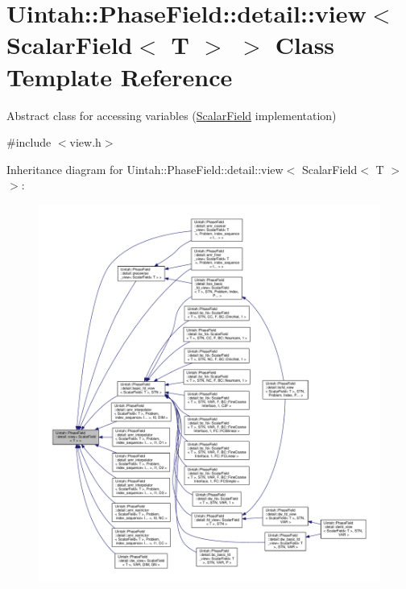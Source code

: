 \hypertarget{classUintah_1_1PhaseField_1_1detail_1_1view_3_01ScalarField_3_01T_01_4_01_4}{}\section{Uintah\+:\+:Phase\+Field\+:\+:detail\+:\+:view$<$ Scalar\+Field$<$ T $>$ $>$ Class Template Reference}
\label{classUintah_1_1PhaseField_1_1detail_1_1view_3_01ScalarField_3_01T_01_4_01_4}


Abstract class for accessing variables (\hyperlink{structUintah_1_1PhaseField_1_1ScalarField}{Scalar\+Field} implementation)  




{\ttfamily \#include $<$view.\+h$>$}



Inheritance diagram for Uintah\+:\+:Phase\+Field\+:\+:detail\+:\+:view$<$ Scalar\+Field$<$ T $>$ $>$\+:\nopagebreak
\begin{figure}[H]
\begin{center}
\leavevmode
\includegraphics[width=350pt]{classUintah_1_1PhaseField_1_1detail_1_1view_3_01ScalarField_3_01T_01_4_01_4__inherit__graph}
\end{center}
\end{figure}
